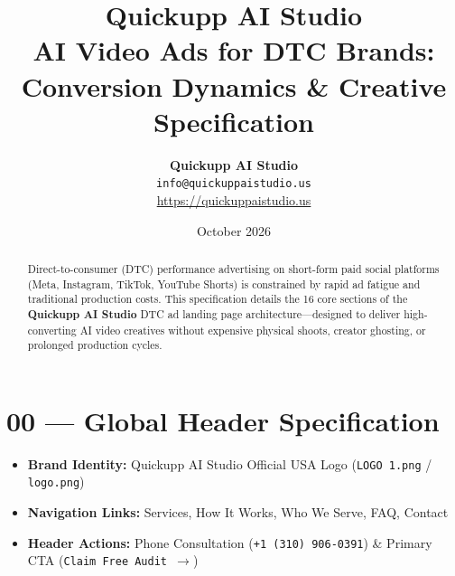 \documentclass[11pt,a4paper]{article}
\title{\textbf{\Huge Quickupp AI Studio}\\[0.5em] \Large AI Video Ads for DTC Brands: Conversion Dynamics \& Creative Specification}
\author{\textbf{Quickupp AI Studio} \\ \texttt{info@quickuppaistudio.us} \\ \url{https://quickuppaistudio.us}}
\date{October 2026}
\begin{document}
\maketitle

\begin{abstract}
Direct-to-consumer (DTC) performance advertising on short-form paid social platforms (Meta, Instagram, TikTok, YouTube Shorts) is constrained by rapid ad fatigue and traditional production costs. This specification details the 16 core sections of the \textbf{Quickupp AI Studio} DTC ad landing page architecture—designed to deliver high-converting AI video creatives without expensive physical shoots, creator ghosting, or prolonged production cycles.
\end{abstract}

\vspace{1em}

\section*{00 --- Global Header Specification}
\begin{itemize}[noitemsep]
    \item \textbf{Brand Identity:} Quickupp AI Studio Official USA Logo (\texttt{LOGO 1.png} / \texttt{logo.png})
    \item \textbf{Navigation Links:} Services, How It Works, Who We Serve, FAQ, Contact
    \item \textbf{Header Actions:} Phone Consultation (\texttt{+1 (310) 906-0391}) \& Primary CTA (\texttt{Claim Free Audit $\rightarrow$})
\end{itemize}
\end{document}

